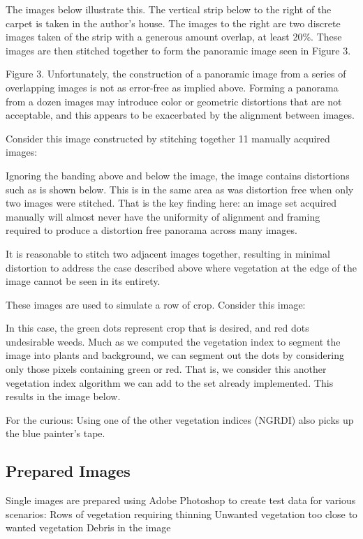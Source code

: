 \documentclass[letterpaper]{article}
\begin{document}
The images below illustrate this. The vertical strip below to the right of the carpet is taken in the author’s house.  The images to the right are two discrete images taken of the strip with  a generous amount overlap, at least 20\%. These images are then stitched together to form the panoramic image seen in Figure 3.


Figure 3. 
Unfortunately, the construction of a panoramic image from a series of  overlapping images is not as error-free as implied above. Forming a panorama from a dozen images may introduce color or geometric distortions that are not acceptable, and this appears to be exacerbated by the alignment between images.

Consider this image constructed by stitching together 11 manually acquired images:


Ignoring the banding above and below the image, the image contains distortions such as is shown below. This is in the same area as was distortion free when only two images were stitched. That is the key finding here: an image set acquired manually will almost never have the uniformity of alignment and framing required to produce a distortion free panorama across many images.



It is reasonable to stitch two adjacent images together, resulting in minimal distortion to address the case described above where vegetation at the edge of the image cannot be seen in its entirety.

These images are used to simulate a row of crop. Consider this image:

In this case, the green dots represent crop that is desired, and red dots undesirable weeds.
Much as we computed the vegetation index to segment the image into plants and background, we can segment out the dots by considering only those pixels containing green or red.  That is, we consider this another vegetation index algorithm we can add to the set already implemented. This results in the image below.




For the curious:  Using one of the other vegetation indices  (NGRDI) also picks up the blue painter’s tape.


\subsection{Prepared Images}
Single images are prepared using Adobe Photoshop to create test data for various scenarios:
Rows of vegetation requiring thinning
Unwanted vegetation too close to wanted vegetation
Debris in the image
\end{document}
